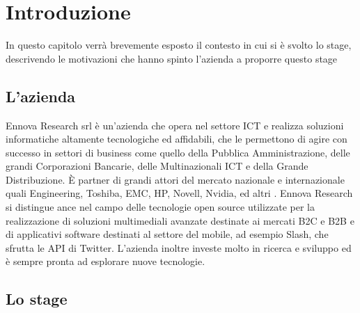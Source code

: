 
\chapter{Introduzione}
\label{cap:introduzione}

In questo capitolo verrà brevemente esposto il contesto in cui si è svolto lo stage, descrivendo le motivazioni che hanno spinto l'azienda a proporre questo stage \\

%
%

\section{L'azienda}

Ennova Research srl è un’azienda che opera nel settore \gls{ICT} e realizza soluzioni
informatiche altamente tecnologiche ed affidabili, che le permettono di agire con
successo in settori di business come quello della Pubblica Amministrazione, delle grandi
Corporazioni Bancarie, delle Multinazionali \gls{ICT} e della Grande Distribuzione.
È partner di grandi attori del mercato nazionale e internazionale quali Engineering,
Toshiba, EMC, HP, Novell, Nvidia, ed altri .
Ennova Research si distingue ance nel campo delle tecnologie open source utilizzate per la
realizzazione di soluzioni multimediali avanzate destinate ai mercati \gls{B2C} e \gls{B2B} e di
applicativi software destinati al settore del mobile, ad esempio Slash, che sfrutta le \gls{API} di Twitter.
L'azienda inoltre investe molto in ricerca e sviluppo ed è sempre pronta ad esplorare nuove tecnologie.

\section{Lo stage}

